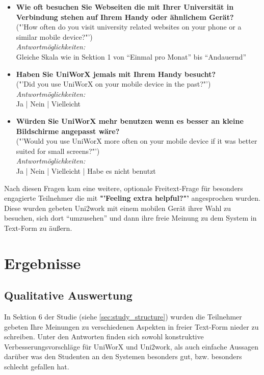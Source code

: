 \documentclass[11pt,a4paper,twoside,ngerman]{article}
\begin{document}
\begin{itemize}
    \item \textbf{Wie oft besuchen Sie Webseiten die mit Ihrer Universität in Verbindung stehen auf Ihrem Handy oder ähnlichem Gerät?} \\ ("'How often do you visit university related websites on your phone or a similar mobile device?"') \\
    \emph{Antwortmöglichkeiten:} \\ Gleiche Skala wie in Sektion 1 von "`Einmal pro Monat"' bis "`Andauernd"'
    \item \textbf{Haben Sie UniWorX jemals mit Ihrem Handy besucht?} \\ ("'Did you use UniWorX on your mobile device in the past?"') \\ \emph{Antwortmöglichkeiten:} \\ Ja | Nein | Vielleicht
    \item \textbf{Würden Sie UniWorX mehr benutzen wenn es besser an kleine Bildschirme angepasst wäre?} \\ ("'Would you use UniWorX more often on your mobile device if it was better suited for small screens?"') \\ \emph{Antwortmöglichkeiten:} \\ Ja | Nein | Vielleicht | Habe es nicht benutzt
\end{itemize}

\noindent
Nach diesen Fragen kam eine weitere, optionale Freitext-Frage für besonders engagierte Teilnehmer die mit \textbf{"'Feeling extra helpful?"'} angesprochen wurden. Diese wurden gebeten Uni2work mit einem mobilen Gerät ihrer Wahl zu besuchen, sich dort "`umzusehen"' und dann ihre freie Meinung zu dem System in Text-Form zu äußern.

\clearpage
\section{Ergebnisse}
\subsection{Qualitative Auswertung} \label{sec:results_qualitative}
In Sektion 6 der Studie (siehe \autoref{sec:study_structure}) wurden die Teilnehmer gebeten Ihre Meinungen zu verschiedenen Aspekten in freier Text-Form nieder zu schreiben. 
Unter den Antworten finden sich sowohl konstruktive Verbesserungsvorschläge für UniWorX und Uni2work, als auch einfache Aussagen darüber was den Studenten an den Systemen besonders gut, bzw. besonders schlecht gefallen hat.
\end{document}
